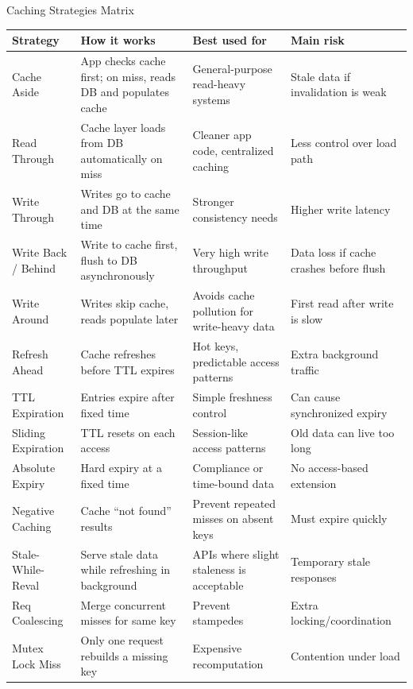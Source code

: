 \documentclass[11pt,a4paper]{article}
\theoremstyle{definition}
\begin{document}
\begin{infobox}{Caching Strategies Matrix}
\small
\centering
\begin{tabularx}{\textwidth}{lXXX}
\toprule
\textbf{Strategy} & \textbf{How it works} & \textbf{Best used for} & \textbf{Main risk} \\
\midrule
Cache Aside & App checks cache first; on miss, reads DB and populates cache & General-purpose read-heavy systems & Stale data if invalidation is weak \\
\addlinespace
Read Through & Cache layer loads from DB automatically on miss & Cleaner app code, centralized caching & Less control over load path \\
\addlinespace
Write Through & Writes go to cache and DB at the same time & Stronger consistency needs & Higher write latency \\
\addlinespace
Write Back / Behind & Write to cache first, flush to DB asynchronously & Very high write throughput & Data loss if cache crashes before flush \\
\addlinespace
Write Around & Writes skip cache, reads populate later & Avoids cache pollution for write-heavy data & First read after write is slow \\
\addlinespace
Refresh Ahead & Cache refreshes before TTL expires & Hot keys, predictable access patterns & Extra background traffic \\
\addlinespace
TTL Expiration & Entries expire after fixed time & Simple freshness control & Can cause synchronized expiry \\
\addlinespace
Sliding Expiration & TTL resets on each access & Session-like access patterns & Old data can live too long \\
\addlinespace
Absolute Expiry & Hard expiry at a fixed time & Compliance or time-bound data & No access-based extension \\
\addlinespace
Negative Caching & Cache ``not found'' results & Prevent repeated misses on absent keys & Must expire quickly \\
\addlinespace
Stale-While-Reval & Serve stale data while refreshing in background & APIs where slight staleness is acceptable & Temporary stale responses \\
\addlinespace
Req Coalescing & Merge concurrent misses for same key & Prevent stampedes & Extra locking/coordination \\
\addlinespace
Mutex Lock Miss & Only one request rebuilds a missing key & Expensive recomputation & Contention under load \\

\end{tabularx}
\end{infobox}
\end{document}

